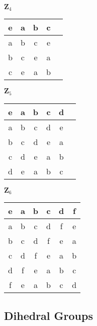 \begin{table} [H]
\centering
\begin{minipage}[b]{0.3\linewidth}\centering
 $\mathbf{Z}_4$\\
\begin{tabular}{c||cccc} 

 e & a & b & c \\ 
  \hline 
     a & b & c & e \\
     b & c & e & a \\
     c & e & a & b \\
    
     
\end{tabular} 
\end{minipage}
\hspace*{5mm}
\begin{minipage}[b]{0.3\linewidth}\centering
 $\mathbf{Z}_5$\\
\begin{tabular}{c||ccccc} 

  e & a & b & c & d \\ 
  \hline 
     a & b & c & d & e \\
     b & c & d & e & a \\
     c & d & e & a & b \\
     d & e & a & b & c \\

     
\end{tabular} 
\end{minipage}
\hspace*{5mm}
\begin{minipage}[b]{0.3\linewidth}\centering
$\mathbf{Z}_6$\\
\begin{tabular}{c||ccccc} 

   e & a & b & c & d & f \\ 
  \hline 
     a & b & c & d & f & e \\
     b & c & d & f & e & a \\
     c & d & f & e & a & b \\
     d & f & e & a & b & c \\
     f & e & a & b & c & d \\
     
\end{tabular} 
\end{minipage}
\end{table}
 
\subsection{Dihedral Groups} 

